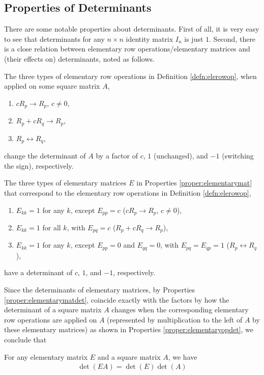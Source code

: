 \subsection{Properties of Determinants} There are some notable properties about determinants. First of all, it is very easy to see that determinants for any $n \times n$ identity matrix $I_n$ is just $1$. Second, there is a close relation between elementary row operations/elementary matrices and (their effects on) determinants, noted as follows.
\begin{proper}
\label{proper:elementaryopdet}
The three types of elementary row operations in Definition \ref{defn:elerowop}, when applied on some square matrix $A$,
\begin{enumerate}
\item $cR_{p} \to R_{p}$, $c \neq 0$,
\item $R_{p} + cR_{q} \to R_{p}$,
\item $R_{p} \leftrightarrow R_{q}$,
\end{enumerate}
change the determinant of $A$ by a factor of $c$, $1$ (unchanged), and $-1$ (switching the sign), respectively.
\end{proper}
\begin{proper}
\label{proper:elementarymatdet}
The three types of elementary matrices $E$ in Properties \ref{proper:elementarymat} that correspond to the elementary row operations in Definition \ref{defn:elerowop},
\begin{enumerate}
\item $E_{kk} = 1$ for any $k$, except $E_{pp} = c$ ($cR_{p} \to R_{p}$, $c \neq 0$),
\item $E_{kk} = 1$ for all $k$, with $E_{pq} = c$ ($R_{p} + cR_{q} \to R_{p}$),
\item $E_{kk} = 1$ for any $k$, except $E_{pp} = 0$ and $E_{qq} = 0$, with $E_{pq} = E_{qp} = 1$ ($R_{p} \leftrightarrow R_{q}$),
\end{enumerate}
have a determinant of $c$, $1$, and $-1$, respectively.
\end{proper}
Since the determinants of elementary matrices, by Properties \ref{proper:elementarymatdet}, coincide exactly with the factors by how the determinant of a square matrix $A$ changes when the corresponding elementary row operations are applied on $A$ (represented by multiplication to the left of $A$ by these elementary matrices) as shown in Properties \ref{proper:elementaryopdet}, we conclude that
\begin{thm}
\label{thm:elementarytimesdet}
For any elementary matrix $E$ and a square matrix $A$, we have
\begin{align*}
\det(EA) = \det(E)\det(A)
\end{align*}
\end{thm}
